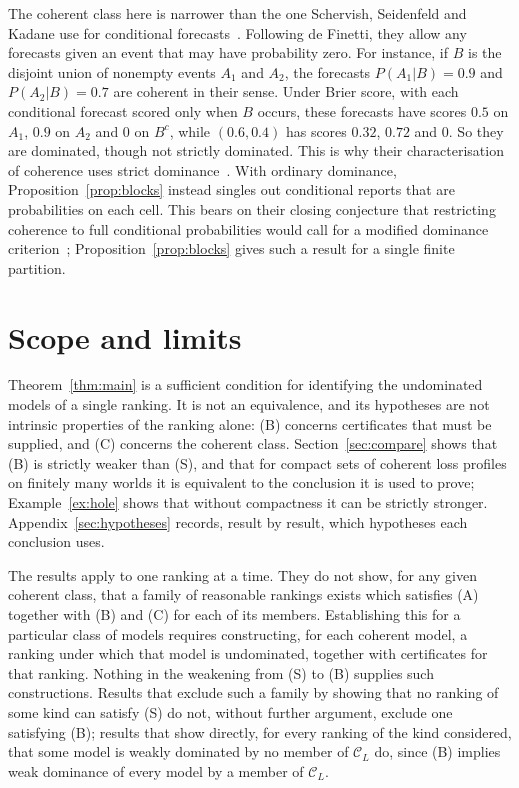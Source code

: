 \documentclass[11pt]{article}
\theoremstyle{definition}
\theoremstyle{remark}
\newcommand{\C}{\mathcal C}
\begin{document}
The coherent class here is narrower than the one Schervish, Seidenfeld and Kadane use for conditional forecasts~\cite{SSK09}. Following de Finetti, they allow any forecasts given an event that may have probability zero. For instance, if $B$ is the disjoint union of nonempty events $A_1$ and $A_2$, the forecasts $P(A_1|B)=0.9$ and $P(A_2|B)=0.7$ are coherent in their sense. Under Brier score, with each conditional forecast scored only when $B$ occurs, these forecasts have scores $0.5$ on $A_1$, $0.9$ on $A_2$ and $0$ on $B^c$, while $(0.6,0.4)$ has scores $0.32$, $0.72$ and $0$. So they are dominated, though not strictly dominated. This is why their characterisation of coherence uses strict dominance~\cite[Theorem~1]{SSK09}. With ordinary dominance, Proposition~\ref{prop:blocks} instead singles out conditional reports that are probabilities on each cell. This bears on their closing conjecture that restricting coherence to full conditional probabilities would call for a modified dominance criterion~\cite[Section~6]{SSK09}; Proposition~\ref{prop:blocks} gives such a result for a single finite partition.


\section{Scope and limits}\label{sec:scope}
Theorem~\ref{thm:main} is a sufficient condition for identifying the undominated models of a single ranking. It is not an equivalence, and its hypotheses are not intrinsic properties of the ranking alone: (B) concerns certificates that must be supplied, and (C) concerns the coherent class. Section~\ref{sec:compare} shows that (B) is strictly weaker than (S), and that for compact sets of coherent loss profiles on finitely many worlds it is equivalent to the conclusion it is used to prove; Example~\ref{ex:hole} shows that without compactness it can be strictly stronger. Appendix~\ref{sec:hypotheses} records, result by result, which hypotheses each conclusion uses.

The results apply to one ranking at a time. They do not show, for any given coherent class, that a family of reasonable rankings exists which satisfies (A) together with (B) and (C) for each of its members. Establishing this for a particular class of models requires constructing, for each coherent model, a ranking under which that model is undominated, together with certificates for that ranking. Nothing in the weakening from (S) to (B) supplies such constructions. Results that exclude such a family by showing that no ranking of some kind can satisfy (S) do not, without further argument, exclude one satisfying (B); results that show directly, for every ranking of the kind considered, that some model is weakly dominated by no member of $\C_L$ do, since (B) implies weak dominance of every model by a member of $\C_L$.
\end{document}
